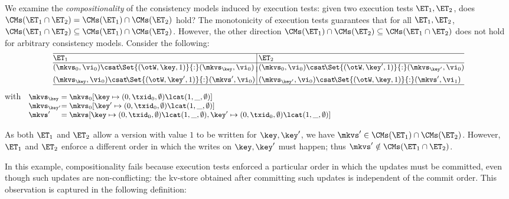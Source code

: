We examine the \emph{compositionality} of the consistency models induced by execution tests:  
\ie given two execution tests $\ET_1, \ET_2$, does 
$\CMs(\ET_1 \cap \ET_2) = \CMs(\ET_1) \cap \CMs(\ET_2)$ hold? 
The monotonicity of execution tests guarantees that 
 for all $\ET_1, \ET_2$, \( \CMs(\ET_1 \cap \ET_2) \subseteq \CMs(\ET_1) \cap \CMs(\ET_2) \). 
However, the other direction \( \CMs(\ET_1) \cap \CMs(\ET_2) \subseteq \CMs(\ET_1 \cap \ET_2) \) does not hold for arbitrary consistency models.
Consider the following:
%
\[
\small
\begin{array}{@{}l @{\hspace{2pt}} | @{\hspace{2pt}} l@{}}
    \hline
    \ET_1 & \ET_2 \\
%    
    \hline
    (\mkvs_{0}, \vi_{0}) \csat\! \Set{(\otW, \key, 1)} {:} ( \mkvs_{\key}, \vi_{0})
    &
    (\mkvs_{0}, \vi_{0}) \csat\! \Set{(\otW, \key', 1)} {:} ( \mkvs_{\key'}, \vi_{0}) 
    \vspace*{-7pt}\\\\
    (\mkvs_{\key}, \vi_{0}) \csat  \!\Set{(\otW, \key', 1)} {:} (\mkvs',\vi_{0}) 
    &
    (\mkvs_{\key'}, \vi_{0}) \csat \!\Set{(\otW, \key, 1)} {:} (\mkvs',\vi_{1}) 
    \\
\hline
\end{array}
\]%
%
with%
%
{
\(
\small
\begin{array}[t]{l@{} l}
    \mkvs_{\key} & = \mkvs_{0}[\key \mapsto (0, \txid_{0}, \emptyset) \lcat (1, \_, \emptyset)] \\
    \mkvs_{\key'} & = \mkvs_{0}[\key' \mapsto (0, \txid_{0}, \emptyset) \lcat (1, \_, \emptyset)] \\
    \mkvs' & = \mkvs[\key \mapsto (0, \txid_{0}, \emptyset) \lcat (1, \_, \emptyset) 
                ,\key' \mapsto (0, \txid_{0}, \emptyset) \lcat (1, \_, \emptyset)] \\
\end{array}
\)%
}%
%

\noindent As both $\ET_1$ and $\ET_2$ allow a version with value $1$ to be written for 
$\key, \key'$,  we have $\mkvs' \in \CMs(\ET_1) \cap \CMs(\ET_2)$. 
However, $\ET_1$ and $\ET_2$ enforce a different order in which the writes on $\key, \key'$ must happen; 
thus $\mkvs' \notin \CMs(\ET_1 \cap \ET_2)$. 

In this example, compositionality fails because execution tests 
enforced a particular order in which the updates must be committed, even though such updates 
are non-conflicting: the kv-store obtained after committing such updates is independent of the commit order. 
This observation is captured in the following definition: 

